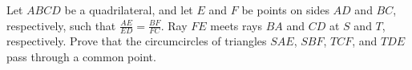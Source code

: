 Let $ABCD$ be a quadrilateral, and let $E$ and $F$ be points on sides $AD$ and $BC$, respectively, such that $\frac{AE}{ED}=\frac{BF}{FC}$. Ray $FE$ meets rays $BA$ and $CD$ at $S$ and $T$, respectively. Prove that the circumcircles of triangles $SAE$, $SBF$, $TCF$, and $TDE$ pass through a common point.
